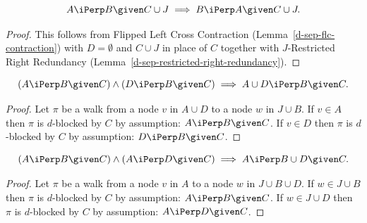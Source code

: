 \begin{Lem}
    \[A \iPerp  B \given C \cup J \implies B \iPerp A \given C \cup J.\]
\begin{proof}
  This follows from Flipped Left Cross Contraction (Lemma~\ref{d-sep-flc-contraction}) with $D=\emptyset$ and $C \cup J$ in place of $C$ together with
    $J$-Restricted Right Redundancy (Lemma~\ref{d-sep-restricted-right-redundancy}).
\end{proof}
\end{Lem}


\begin{Lem}
    \[ (A \iPerp  B \given  C) \land (D \iPerp  B \given C) \implies A \cup D \iPerp  B \given C.\]
\begin{proof}
    Let $\pi$ be a walk from a node $v$ in $A \cup D$ to a node $w$ in $J \cup B$.
    If $v \in A$ then $\pi$ is $d$-blocked by $C$ by assumption: $A \iPerp  B \given  C$.
    If $v \in D$ then $\pi$ is $d$-blocked by $C$ by assumption: $D \iPerp  B \given  C$.
\end{proof}
\end{Lem}

\begin{Lem}
    \[ (A \iPerp  B \given  C) \land (A \iPerp  D \given C) \implies A \iPerp  B \cup  D \given C.\]
\begin{proof}
    Let $\pi$ be a walk from a node $v$ in $A$ to a node $w$ in  $J \cup B \cup D$.
    If $w \in J \cup B$ then $\pi$ is $d$-blocked by $C$ by assumption: $A \iPerp  B \given  C$.
    If $w \in J \cup D$ then $\pi$ is $d$-blocked by $C$ by assumption: $A \iPerp  D \given  C$.
\end{proof}
\end{Lem}

